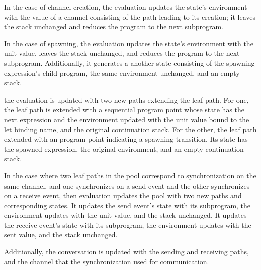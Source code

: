 \documentclass{article}
\begin{document}
In the case of channel creation, the evaluation updates the state's environment with the
value of a channel consisting of the path leading to its creation; it leaves the stack
unchanged and reduces the program to the next subprogram.

In the case of spawning, the evaluation updates the state's environment with the
unit value, leaves the stack unchanged, and reduces the program to the next subprogram.
Additionally, it generates a another state consisting of the spawning expression's child
program, the same environment unchanged, and an empty stack.

the evaluation is updated with two
new paths extending the leaf path.  For one, the leaf path is extended with a sequential
program point whose state has the next expression and the environment updated
with the unit value bound to
the let binding name, and the original continuation stack. For the other, the leaf path
extended with an program point indicating a spawning transition.  Its state has the spawned
expression, the original environment, and an empty continuation stack. 

In the case where two leaf paths in the pool correspond to synchronization on the same channel,
and one synchronizes on a send event and the other synchronizes on a receive event, then
evaluation updates the pool with two new paths and corresponding states.
It updates the send event's state with its subprogram, the environment updates with the unit
value, and the stack unchanged.  It updates the receive event's state with its subprogram, the
environment updates with the sent value, and the stack unchanged.

Additionally, the conversation is updated with the sending and receiving paths, and the channel
that the synchronization used for communication. 
\end{document}
